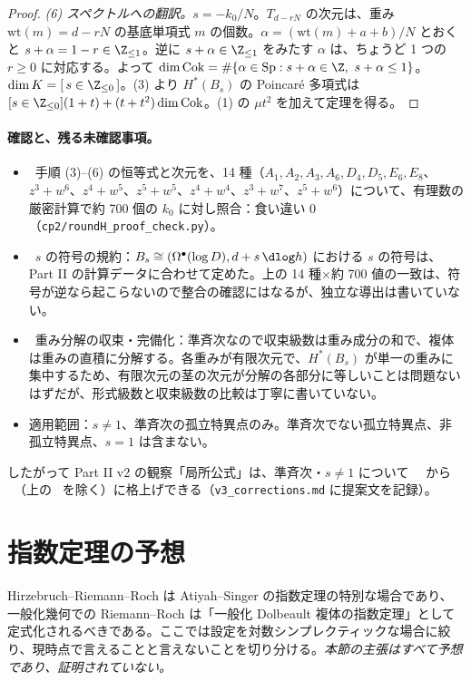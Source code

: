 \begin{proof}
\emph{(6) スペクトルへの翻訳。}$s=-k_0/N$。$T_{d-rN}$ の次元は、重み $\mathrm{wt}(m)=d-rN$ の基底単項式 $m$ の個数。$\alpha=(\mathrm{wt}(m)+a+b)/N$ とおくと $s+\alpha=1-r\in\Z_{\le1}$。逆に $s+\alpha\in\Z_{\le1}$ をみたす $\alpha$ は、ちょうど 1 つの $r\ge0$ に対応する。よって $\dim\mathrm{Cok}=\#\{\alpha\in\mathrm{Sp}:s+\alpha\in\Z,\ s+\alpha\le1\}$。$\dim K=[\,s\in\Z_{\le0}\,]$。(3) より $H^*(B_s)$ の Poincar\'e 多項式は $[s\in\Z_{\le0}](1+t)+(t+t^2)\dim\mathrm{Cok}$。(1) の $\mu t^2$ を加えて定理を得る。
\end{proof}
\paragraph{確認と、残る未確認事項。}
\begin{itemize}
\item \tV\ 手順 (3)--(6) の恒等式と次元を、14 種（$A_1,A_2,A_3,A_6,D_4,D_5,E_6,E_8$、$z^3+w^6$、$z^4+w^5$、$z^5+w^5$、$z^4+w^4$、$z^3+w^7$、$z^5+w^6$）について、有理数の厳密計算で約 700 個の $k_0$ に対し照合：食い違い 0（\texttt{cp2/roundH\_proof\_check.py}）。
\item \tQ\ $s$ の符号の規約：$B_s\cong(\Omega^\bullet(\log D),d+s\,\dlog h)$ における $s$ の符号は、Part II の計算データに合わせて定めた。上の 14 種×約 700 値の一致は、符号が逆なら起こらないので整合の確認にはなるが、独立な導出は書いていない。
\item \tQ\ 重み分解の収束・完備化：準斉次なので収束級数は重み成分の和で、複体は重みの直積に分解する。各重みが有限次元で、$H^*(B_s)$ が単一の重みに集中するため、有限次元の茎の次元が分解の各部分に等しいことは問題ないはずだが、形式級数と収束級数の比較は丁寧に書いていない。
\item 適用範囲：$s\ne1$、準斉次の孤立特異点のみ。準斉次でない孤立特異点、非孤立特異点、$s=1$ は含まない。
\end{itemize}
したがって Part II v2 の観察「局所公式」は、準斉次・$s\ne1$ について \tV\ \tK\ から \tP\ （上の \tQ\ を除く）に格上げできる（\texttt{v3\_corrections.md} に提案文を記録）。

\section{指数定理の予想}\label{sec:index}
Hirzebruch--Riemann--Roch は Atiyah--Singer の指数定理の特別な場合であり、一般化幾何での Riemann--Roch は「一般化 Dolbeault 複体の指数定理」として定式化されるべきである。ここでは設定を対数シンプレクティックな場合に絞り、現時点で言えることと言えないことを切り分ける。\emph{本節の主張はすべて予想であり、証明されていない。}

